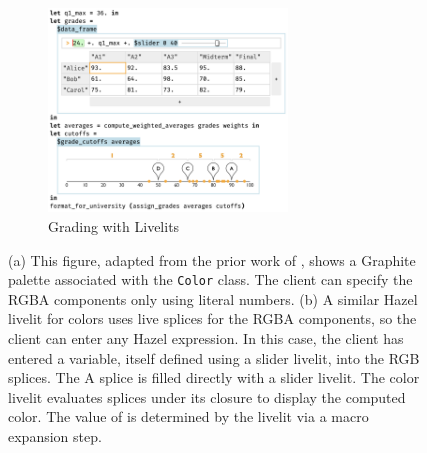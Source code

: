 \begin{figure}[htb]
  \begin{subfigure}[b]{0.7\textwidth}
    \includegraphics[width=15pc]{grade-cutoff-livelit.png}
    \caption{Grading with Livelits}
    \label{fig:grading}
    \label{fig:color}
   \end{subfigure}   
   
 \caption{
   (a) This figure, adapted from the prior work of \citet{Graphite},
   shows a Graphite palette associated with the \texttt{Color} class.
   The client can specify the RGBA components only using literal numbers.
   (b) A similar Hazel livelit for colors uses live splices for the RGBA components,
   so the client can enter any Hazel expression.
   In this case, the client has entered a variable, itself defined using a slider livelit, into the RGB
   splices. The A splice is filled directly with a slider livelit.
   The color livelit evaluates splices under its closure to display the
   computed color.
   The value of  is determined by the livelit via a macro expansion step.}
   \label{fig:color}
 \end{figure}

